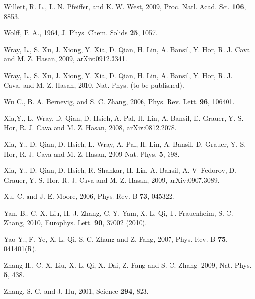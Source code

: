 \documentclass[twocolumn,floatfix,showpacs,rmp,aps]{revtex4}
\begin{document}
\begin{thebibliography}{99}
Willett, R. L., L. N. Pfeiffer, and K. W. West, 2009,
Proc. Natl. Acad. Sci. {\bf 106}, 8853.

Wolff, P. A., 1964,
J. Phys. Chem. Solids {\bf 25}, 1057.


Wray, L., S. Xu, J. Xiong, Y. Xia, D. Qian, H. Lin, A. Bansil, Y. Hor, R. J. Cava and M. Z. Hasan, 2009,
arXiv:0912.3341.

Wray, L., S. Xu, J. Xiong, Y. Xia, D. Qian, H. Lin, A. Bansil, Y.
Hor, R. J. Cava, and M. Z. Hasan, 2010, Nat. Phys. (to be
published).

Wu C., B. A. Bernevig, and S. C. Zhang, 2006,
Phys. Rev. Lett. {\bf 96}, 106401.

Xia,Y., L. Wray, D. Qian, D. Hsieh, A. Pal, H. Lin, A. Bansil, D. Grauer,
Y. S. Hor, R. J. Cava and M. Z. Hasan, 2008,
arXiv:0812.2078.

Xia, Y., D. Qian, D. Hsieh, L. Wray, A. Pal, H. Lin, A. Bansil, D. Grauer, Y. S. Hor,
R. J. Cava and M. Z. Hasan, 2009
Nat. Phys. {\bf 5}, 398.

Xia, Y., D. Qian, D. Hsieh, R. Shankar, H. Lin, A. Bansil, A. V. Fedorov, D. Grauer,
Y. S. Hor, R. J. Cava and M. Z. Hasan, 2009,
arXiv:0907.3089.

Xu, C. and J. E. Moore, 2006,
Phys. Rev. B {\bf 73}, 045322.

Yan, B., C. X. Liu, H. J. Zhang, C. Y. Yam, X. L. Qi, T. Frauenheim, S. C. Zhang, 2010,
Europhys. Lett. {\bf 90}, 37002 (2010).

Yao Y., F. Ye, X. L. Qi, S. C. Zhang and Z. Fang, 2007,
Phys. Rev. B {\bf 75}, 041401(R).

Zhang H., C. X. Liu, X. L. Qi, X. Dai, Z. Fang and S. C. Zhang, 2009,
Nat. Phys. {\bf 5}, 438.

Zhang, S. C. and J. Hu, 2001,
Science {\bf 294}, 823.


\end{thebibliography}
\end{document}
